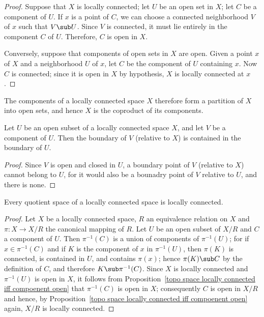\begin{proof}
Suppose that $X$ is locally connected; let $U$ be an open set in $X$; let $C$ be a component of $U$. If $x$ is a point of $C$, we can choose a connected neighborhood $V$ of $x$ such that $V\sub U$. Since $V$ is connected, it must lie entirely in the component $C$ of $U$. Therefore, $C$ is open in $X$.\par
Conversely, suppose that components of open sets in $X$ are open. Given a point $x$ of $X$ and a neighborhood $U$ of $x$, let $C$ be the component of $U$ containing $x$. Now $C$ is connected; since it is open in $X$ by hypothesis, $X$ is locally connected at $x$.
\end{proof}
The components of a locally connected space $X$ therefore form a partition of $X$ into open sets, and hence $X$ is the coproduct of its components.
\begin{corollary}
Let $U$ be an open subset of a locally connected space $X$, and let $V$ be a component of $U$. Then the boundary of $V$ (relative to $X$) is contained in the boundary of $U$.
\end{corollary}
\begin{proof}
Since $V$ is open and closed in $U$, a boundary point of $V$ (relative to $X$) cannot belong to $U$, for it would also be a bounadry point of $V$ relative to $U$, and there is none.
\end{proof}
\begin{proposition}\label{topo space quotient space locally connected}
Every quotient space of a locally connected space is locally connected.
\end{proposition}
\begin{proof}
Let $X$ be a locally connected space, $R$ an equivalence relation on $X$ and $\pi:X\to X/R$ the canonical mapping of $R$. Let $U$ be an open subset of $X/R$ and $C$ a component of $U$. Then $\pi^{-1}(C)$ is a union of components of $\pi^{-1}(U)$; for if $x\in\pi^{-1}(C)$ and if $K$ is the component of $x$ in $\pi^{-1}(U)$, then $\pi(K)$ is connected, is contained in $U$, and contains $\pi(x)$; hence $\pi(K)\sub C$ by the definition of $C$, and therefore $K\sub\pi^{-1}(C)$. Since $X$ is locally connected and $\pi^{-1}(U)$ is open in $X$, it follows from Proposition~\ref{topo space locally connected iff compoenent open} that $\pi^{-1}(C)$ is open in $X$; consequently $C$ is open in $X/R$ and hence, by Proposition~\ref{topo space locally connected iff compoenent open} again, $X/R$ is locally connected.
\end{proof}
